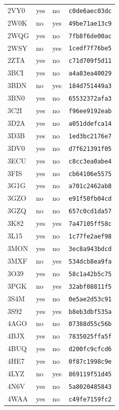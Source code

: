 \documentclass[11pt]{article}
\begin{document}
\begin{longtable}{llll}
2VY0 & yes & no & \texttt{c0de6aec03dc}\\
2W0K & no & yes & \texttt{49be71ae13c9}\\
2WQG & yes & no & \texttt{7fb8f6de00ac}\\
2WSY & no & yes & \texttt{1cedf7f76be5}\\
2ZTA & yes & no & \texttt{c71d709f5d11}\\
3BCI & yes & no & \texttt{a4a83ea40029}\\
3BDN & no & yes & \texttt{184d751449a3}\\
3BN0 & yes & no & \texttt{65532372afa3}\\
3C2I & yes & no & \texttt{f96ee9192eab}\\
3D2A & yes & no & \texttt{a051ddefca14}\\
3D3B & yes & no & \texttt{1ed3bc2176e7}\\
3DV0 & yes & no & \texttt{d7f621391f05}\\
3ECU & yes & no & \texttt{c8cc3ea0abe4}\\
3FIS & yes & no & \texttt{cb64106e5575}\\
3G1G & yes & no & \texttt{a701c2462ab8}\\
3GZO & no & no & \texttt{e91f50fb04cd}\\
3GZQ & no & no & \texttt{657c0cd1da57}\\
3K82 & yes & yes & \texttt{7a47105ff58c}\\
3L15 & yes & no & \texttt{1c77fe2aef98}\\
3MON & yes & no & \texttt{3ec8a943bdcd}\\
3MXF & no & yes & \texttt{534dcb8ea9fa}\\
3O39 & yes & no & \texttt{58c1a42b5c75}\\
3PGK & no & yes & \texttt{32abf08811f5}\\
3S4M & yes & no & \texttt{0e5ae2d53c91}\\
3S92 & yes & yes & \texttt{b8eb3dbf535a}\\
4AGO & no & no & \texttt{07388d55c56b}\\
4BJX & yes & no & \texttt{7835025ffa5f}\\
4BUQ & yes & no & \texttt{d200fc9cfcd6}\\
4HE7 & yes & no & \texttt{0f87c1998c9e}\\
4LYZ & no & yes & \texttt{869119f51d45}\\
4N6V & yes & no & \texttt{5a8020485843}\\
4WAA & yes & no & \texttt{c49fe7159fc2}\\

\end{longtable}
\end{document}
